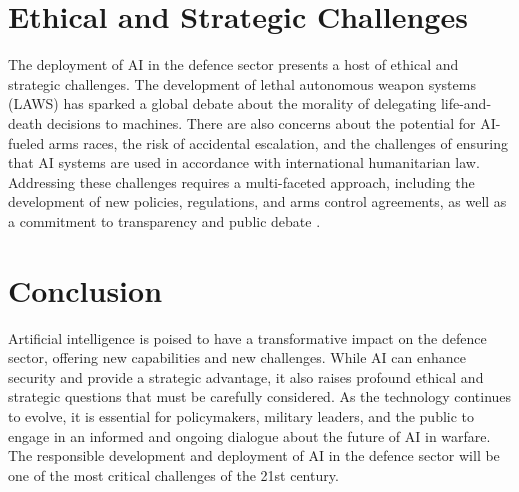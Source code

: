 \section{Ethical and Strategic Challenges}

The deployment of AI in the defence sector presents a host of ethical and strategic challenges. The development of lethal autonomous weapon systems (LAWS) has sparked a global debate about the morality of delegating life-and-death decisions to machines. There are also concerns about the potential for AI-fueled arms races, the risk of accidental escalation, and the challenges of ensuring that AI systems are used in accordance with international humanitarian law. Addressing these challenges requires a multi-faceted approach, including the development of new policies, regulations, and arms control agreements, as well as a commitment to transparency and public debate \parencite{dignum2019responsible}.

\section{Conclusion}

Artificial intelligence is poised to have a transformative impact on the defence sector, offering new capabilities and new challenges. While AI can enhance security and provide a strategic advantage, it also raises profound ethical and strategic questions that must be carefully considered. As the technology continues to evolve, it is essential for policymakers, military leaders, and the public to engage in an informed and ongoing dialogue about the future of AI in warfare. The responsible development and deployment of AI in the defence sector will be one of the most critical challenges of the 21st century.